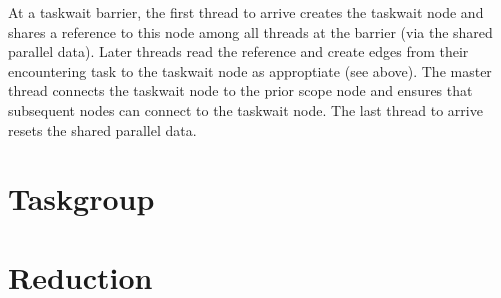 \documentclass[11pt,a4paper]{article}
\begin{document}
At a taskwait barrier, the first thread to arrive creates the taskwait node and shares a reference to this node among all threads at the barrier (via the shared parallel data). Later threads read the reference and create edges from their encountering task to the taskwait node as approptiate (see above). The master thread connects the taskwait node to the prior scope node and ensures that subsequent nodes can connect to the taskwait node. The last thread to arrive resets the shared parallel data.

\section{Taskgroup}

\section{Reduction}
\end{document}
